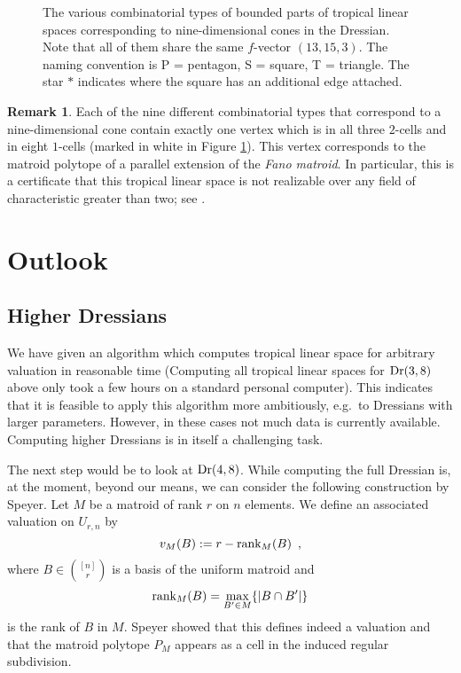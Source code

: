 \documentclass[11pt,a4paper]{amsart}
\theoremstyle{definition}
\newtheorem{remark}[definition]{Remark}
\theoremstyle{plain}
\begin{document}
\begin{figure}[ht]
 \centering
  

  \caption{The various combinatorial types of bounded parts of tropical linear spaces corresponding to nine-dimensional cones in the Dressian.
    Note that all of them share the same $f$-vector $(13,15,3)$.
    The naming convention is P = pentagon, S  = square, T = triangle.
    The star $*$ indicates where the square has an additional edge attached.}\label{figure:combinatorial_types}
\end{figure}

\begin{remark}
   Each of the nine different combinatorial types that correspond to a nine-dimensional cone contain exactly one vertex which is in all three $2$-cells and in eight $1$-cells (marked in white in Figure \ref{figure:combinatorial_types}). This vertex corresponds to the matroid polytope of a parallel extension of the \emph{Fano matroid}. In particular, this is a certificate that this tropical linear space is not realizable over any field of characteristic greater than two; see \cite[Chapter 6 and Appendix]{Oxley:2011}. 
\end{remark}

\section{Outlook}

\subsection{Higher Dressians}

We have given an algorithm which computes tropical linear space for arbitrary valuation in reasonable time (Computing all tropical linear spaces for ${\textnormal{Dr}}(3,8)$ above only took a few hours on a standard personal computer). 
This indicates that it is feasible to apply this algorithm more ambitiously, e.g.\ to Dressians with larger parameters.
However, in these cases not much data is currently available.
Computing higher Dressians is in itself a challenging task.

The next step would be to look at ${\textnormal{Dr}}(4,8)$.
While computing the full Dressian is, at the moment, beyond our means, we can consider the following construction by Speyer\cite{Speyer:2008}. Let $M$ be a matroid of rank $r$ on $n$ elements. We define an associated valuation on $U_{r,n}$ by
\begin{equation}
 v_M(B) := r - {\textnormal{rank}}_M(B)\enspace,
\end{equation}
where $B \in \binom{[n]}{r}$ is a basis of the uniform matroid and 
\begin{equation}
 {\textnormal{rank}}_M(B) = \max_{B' \in M} \{ \lvert B \cap B'\rvert\}
\end{equation}
is the rank of $B$ in $M$. Speyer showed that this defines indeed a valuation and that the matroid polytope $P_M$ appears as a cell in the induced regular subdivision.
\end{document}
